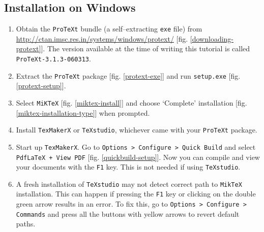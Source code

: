\documentclass[12pt,a4paper]{article}
\begin{document}
\subsection{Installation on Windows}
\begin{enumerate}
\item Obtain the \verb|ProTeXt| bundle (a self--extracting \verb|exe| file) from \url{http://ctan.imsc.res.in/systems/windows/protext/} [fig. \ref{downloading-protext}]. The version available at the time of writing this tutorial is called \verb|ProTeXt-3.1.3-060313|.
\item Extract the \verb|ProTeXt| package [fig. \ref{protext-exe}] and run \verb|setup.exe| [fig. \ref{protext-setup}].
\item Select \verb|MiKTeX| [fig. \ref{miktex-install}] and choose `Complete' installation [fig. \ref{miktex-installation-type}] when prompted.
\item Install \verb|TexMakerX| or \verb|TeXstudio|, whichever came with your \verb|ProTeXt| package.
\item Start up \verb|TexMakerX|. Go to \verb|Options > Configure > Quick Build| and select\\ \verb|PdfLaTeX + View PDF| [fig. \ref{quickbuild-setup}]. Now you can compile and view your documents with the \verb|F1| key. This is not needed if using \verb|TeXstudio|.
\item A fresh installation of \verb|TeXstudio| may not detect correct path to \verb|MikTeX| installation. This can happen if pressing the \verb|F1| key or clicking on the double green arrow results in an error. To fix this, go to \verb|Options > Configure > Commands| and press all the buttons with yellow arrows to revert default paths.
\end{enumerate}
\end{document}
